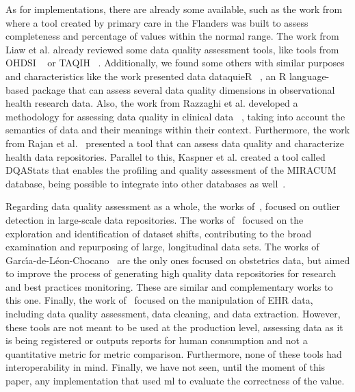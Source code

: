 As for implementations, there are already some available, such as the work from \cite{phanAutomatedDataCleaning2020} where a tool created by primary care in the Flanders was built to assess completeness and percentage of values within the normal range. The work from Liaw et al. \cite{liawQualityAssessmentRealworld2021} already reviewed some data quality assessment tools, like tools from OHDSI \unskip~\cite{hripcsakObservationalHealthData2015} or TAQIH \unskip~\cite{alvarezsanchezTAQIHToolTabular2019}. Additionally, we found some others with similar purposes and characteristics like the work presented data dataquieR \unskip~\cite{schmidtFacilitatingHarmonizedData2021}, an R language-based package that can assess several data quality dimensions in observational health research data. Also, the work from Razzaghi et al. developed a methodology for assessing data quality in clinical data \unskip~\cite{razzaghiDevelopingSystematicApproach2022}, taking into account the semantics of data and their meanings within their context. Furthermore, the work from Rajan et al.\unskip~\cite{rajanContentAgnosticComputable2019} presented a tool that can assess data quality and characterize health data repositories. Parallel to this, Kaspner et al. created a tool called DQAStats that enables the profiling and quality assessment of the MIRACUM database, being possible to integrate into other databases as well\unskip~\cite{kapsnerLinkingConsortiumWideData2021a}.


Regarding data quality assessment as a whole, the works of\unskip~\cite{estiriSemisupervisedEncodingOutlier2019}, focused on outlier detection in large-scale data repositories. The works of\unskip~\cite{saezEHRtemporalVariabilityDelineatingTemporal2020} focused on the exploration and identification of dataset shifts, contributing to the broad examination and repurposing of large, longitudinal data sets. The works of Garc\'{\i}a-de-L{\'e}on-Chocano\unskip~\cite{garci;a-de-leon-chocanoConstructionQualityassuredInfant2015,garcia-de-leon-chocanoConstructionQualityassuredInfant2016,saStandardizedDataQuality2017} are the only ones focused on obstetrics data, but aimed to improve the process of generating high quality data repositories for research and best practices monitoring. These are similar and complementary works to this one. Finally, the work of\unskip~\cite{springateREHRPackageManipulating2017} focused on the manipulation of EHR data, including data quality assessment, data cleaning, and data extraction. However, these tools are not meant to be used at the production level, assessing data as it is being registered or outputs reports for human consumption and not a quantitative metric for metric comparison. Furthermore, none of these tools had interoperability in mind. Finally, we have not seen, until the moment of this paper, any implementation that used \ac{ml} to evaluate the correctness of the value.

